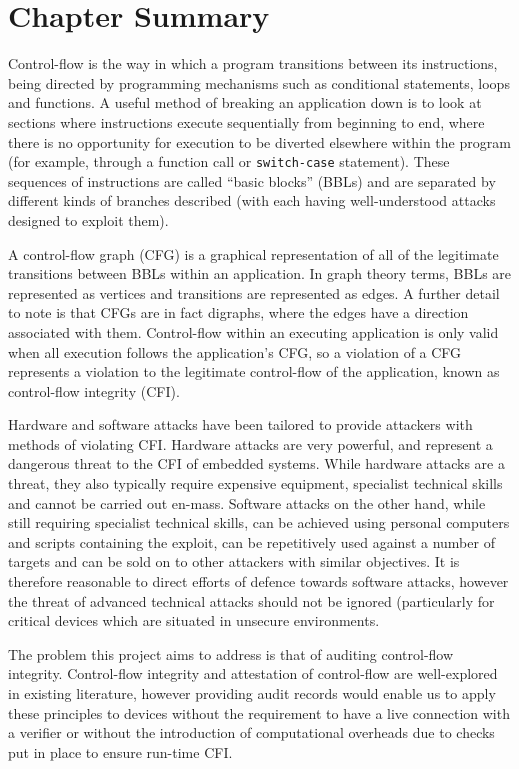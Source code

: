 \section{Chapter Summary}
Control-flow is the way in which a program transitions between its instructions, being directed by programming mechanisms such as conditional statements, loops and functions. A useful method of breaking an application down is to look at sections where instructions execute sequentially from beginning to end, where there is no opportunity for execution to be diverted elsewhere within the program (for example, through a function call or \verb|switch-case| statement). These sequences of instructions are called ``basic blocks'' (BBLs) and are separated by different kinds of branches described (with each having well-understood attacks designed to exploit them).

A control-flow graph (CFG) is a graphical representation of all of the legitimate transitions between BBLs within an application. In graph theory terms, BBLs are represented as vertices and transitions are represented as edges. A further detail to note is that CFGs are in fact digraphs, where the edges have a direction associated with them. Control-flow within an executing application is only valid when all execution follows the application's CFG, so a violation of a CFG represents a violation to the legitimate control-flow of the application, known as control-flow integrity (CFI).

Hardware and software attacks have been tailored to provide attackers with methods of violating CFI. Hardware attacks are very powerful, and represent a dangerous threat to the CFI of embedded systems. While hardware attacks are a threat, they also typically require expensive equipment, specialist technical skills and cannot be carried out en-mass. Software attacks on the other hand, while still requiring specialist technical skills, can be achieved using personal computers and scripts containing the exploit, can be repetitively used against a number of targets and can be sold on to other attackers with similar objectives. It is therefore reasonable to direct efforts of defence towards software attacks, however the threat of advanced technical attacks should not be ignored (particularly for critical devices which are situated in unsecure environments.

The problem this project aims to address is that of auditing control-flow integrity. Control-flow integrity and attestation of control-flow are well-explored in existing literature, however providing audit records would enable us to apply these principles to devices without the requirement to have a live connection with a verifier or without the introduction of computational overheads due to checks put in place to ensure run-time CFI.